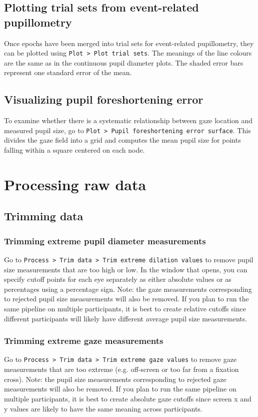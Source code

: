 \documentclass{article}
\begin{document}
\subsection{Plotting trial sets from event-related pupillometry}
Once epochs have been merged into trial sets for event-related pupillometry, they can be plotted using \texttt{Plot > Plot trial sets}. The meanings of the line colours are the same as in the continuous pupil diameter plots. The shaded error bars represent one standard error of the mean.

\subsection{Visualizing pupil foreshortening error}
To examine whether there is a systematic relationship between gaze location and measured pupil size, go to \texttt{Plot > Pupil foreshortening error surface}. This divides the gaze field into a grid and computes the mean pupil size for points falling within a square centered on each node.

\section{Processing raw data}
\subsection{Trimming data}
\subsubsection{Trimming extreme pupil diameter measurements}
Go to \texttt{Process > Trim data > Trim extreme dilation values} to remove pupil size measurements that are too high or low. In the window that opens, you can specify cutoff points for each eye separately as either absolute values or as percentages using a percentage sign. Note: the gaze measurements corresponding to rejected pupil size measurements will also be removed. If you plan to run the same pipeline on multiple participants, it is best to create relative cutoffs since different participants will likely have different average pupil size measurements.
\subsubsection{Trimming extreme gaze measurements}
Go to \texttt{Process > Trim data > Trim extreme gaze values} to remove gaze measurements that are too extreme (e.g. off-screen or too far from a fixation cross). Note: the pupil size measurements corresponding to rejected gaze measurements will also be removed. If you plan to run the same pipeline on multiple participants, it is best to create absolute gaze cutoffs since screen x and y values are likely to have the same meaning across participants.
\end{document}
